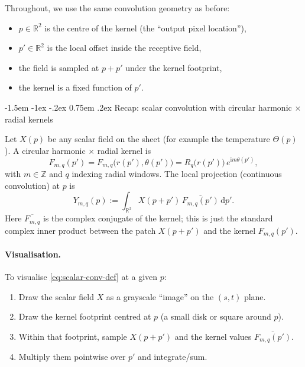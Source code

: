 \documentclass[12pt]{article}
\makeatletter
\renewcommand\subsection{\@startsection{subsection}{2}{\z@}%
                                     {-1.5em \@plus -1ex \@minus -.2ex}%
                                     {0.75em \@plus .2ex}%
                                     {\normalfont\large\bfseries}}
\makeatother
\begin{document}
Throughout, we use the same convolution geometry as before:
\begin{itemize}
  \item $p \in \mathbb{R}^2$ is the centre of the kernel
        (the ``output pixel location''),
  \item $p' \in \mathbb{R}^2$ is the local offset inside the receptive
        field,
  \item the field is sampled at $p+p'$ under the kernel footprint,
  \item the kernel is a fixed function of $p'$.
\end{itemize}

\subsection{Recap: scalar convolution with circular harmonic \texorpdfstring{$\times$}{x} radial kernels}

Let $X(p)$ be any scalar field on the sheet (for example the
temperature $\Theta(p)$). A circular harmonic $\times$ radial kernel is
\[
  F_{m,q}(p')
  = F_{m,q}\bigl(r(p'),\theta(p')\bigr)
  = R_q\bigl(r(p')\bigr)\,e^{\mathrm{i}m\theta(p')},
\]
with $m\in\mathbb{Z}$ and $q$ indexing radial windows. The local
projection (continuous convolution) at $p$ is
\begin{equation}
  \label{eq:scalar-conv-def}
  Y_{m,q}(p)
  :=
  \int_{\mathbb{R}^2}
    X(p+p')\,\overline{F_{m,q}(p')}\,\mathrm{d}p'.
\end{equation}
Here $\overline{F_{m,q}}$ is the complex conjugate of the kernel; this
is just the standard complex inner product between the patch
$X(p+p')$ and the kernel $F_{m,q}(p')$.

\paragraph{Visualisation.}
To visualise \eqref{eq:scalar-conv-def} at a given $p$:

\begin{enumerate}
  \item Draw the scalar field $X$ as a grayscale ``image'' on the
        $(s,t)$ plane.
  \item Draw the kernel footprint centred at $p$ (a small disk or
        square around $p$).
  \item Within that footprint, sample $X(p+p')$ and the kernel
        values $\overline{F_{m,q}(p')}$.
  \item Multiply them pointwise over $p'$ and integrate/sum.
\end{enumerate}
\end{document}
